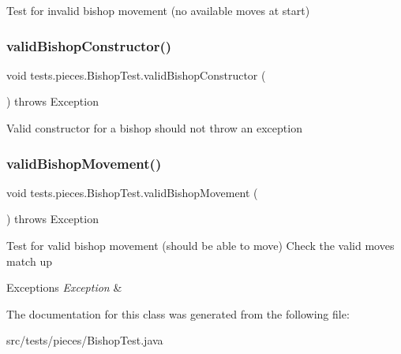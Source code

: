 Test for invalid bishop movement (no available moves at start) \hypertarget{classtests_1_1pieces_1_1_bishop_test_a56e8b7b1d2be0b154ce7a51b3c2851a6}{}\label{classtests_1_1pieces_1_1_bishop_test_a56e8b7b1d2be0b154ce7a51b3c2851a6} 
\subsubsection{\texorpdfstring{valid\+Bishop\+Constructor()}{validBishopConstructor()}}
{\footnotesize\ttfamily void tests.\+pieces.\+Bishop\+Test.\+valid\+Bishop\+Constructor (\begin{DoxyParamCaption}{ }\end{DoxyParamCaption}) throws Exception}

Valid constructor for a bishop should not throw an exception \hypertarget{classtests_1_1pieces_1_1_bishop_test_a8237167f486fa797b996b55c726ad9cc}{}\label{classtests_1_1pieces_1_1_bishop_test_a8237167f486fa797b996b55c726ad9cc} 
\subsubsection{\texorpdfstring{valid\+Bishop\+Movement()}{validBishopMovement()}}
{\footnotesize\ttfamily void tests.\+pieces.\+Bishop\+Test.\+valid\+Bishop\+Movement (\begin{DoxyParamCaption}{ }\end{DoxyParamCaption}) throws Exception}

Test for valid bishop movement (should be able to move) Check the valid moves match up 
\begin{DoxyExceptions}{Exceptions}
{\em Exception} & \\
\hline
\end{DoxyExceptions}


The documentation for this class was generated from the following file\+:\begin{DoxyCompactItemize}
\item 
src/tests/pieces/Bishop\+Test.\+java\end{DoxyCompactItemize}
